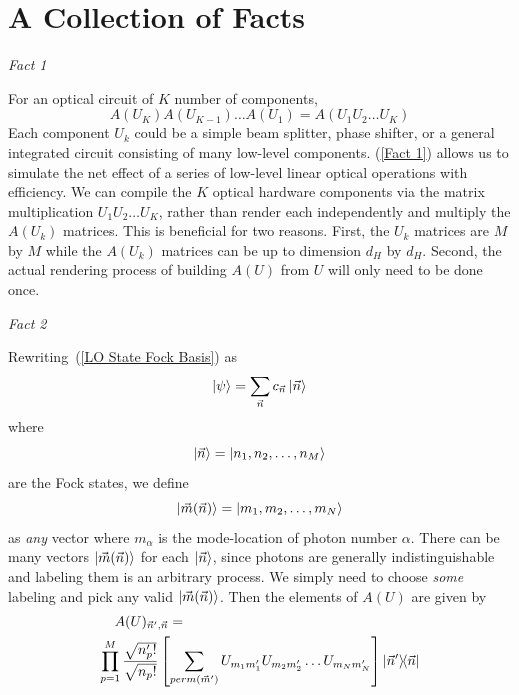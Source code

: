 \documentclass[aps,pra,twocolumn,showpacs,superscriptaddress,floatfix,10pt]{revtex4}
\begin{document}
\section{A Collection of Facts}
\label{Section of Facts}
\begin{center}\textit{Fact 1} \end{center}
For an optical circuit of $K$ number of components,
\begin{equation}
	\label{Fact 1}
\boxed{A(U_K) A(U_{K-1}) \dots A(U_1) = A(U_1 U_2 \dots U_K)}
\end{equation}
Each component $U_k$ could be a simple beam splitter, phase shifter, or a general integrated circuit consisting of many low-level components.
(\ref{Fact 1}) allows us to simulate the net effect of a series of low-level linear optical operations with efficiency. We can compile the $K$ optical hardware components via the matrix multiplication $U_1 U_2 \dots U_K$, rather than render each independently and multiply the $A(U_k)$ matrices. This is beneficial for two reasons. First, the $U_k$ matrices are $M$ by $M$ while the $A(U_k)$ matrices can be up to dimension $d_H$ by $d_H$. Second, the actual rendering process of building $A(U)$ from $U$ will only need to be done once.
\begin{center}\textit{Fact 2} \end{center}
Rewriting~(\ref{LO State Fock Basis}) as
\begin{equation}
\label{LO State Fock Vec Basis}
\ket{\psi} = \sum_{\vec{n}} c_{\vec{n}} \ket{\vec{n}}
\end{equation}
where
\begin{equation}
\ket{\vec{n}} = \ket{n_1,n_2,\dots,n_M}
\end{equation}
are the Fock states, we define
\begin{equation}
\label{m definition}
\ket{\vec{m}(\vec{n})} = \ket{m_1,m_2,\dots,m_N}
\end{equation}
as \textit{any} vector where $m_\alpha$ is the mode-location of photon number $\alpha$. There can be many vectors $\ket{\vec{m}(\vec{n})}$ for each $\ket{\vec{n}}$, since photons are generally indistinguishable and labeling them is an arbitrary process. We simply need to choose \textit{some} labeling and pick any valid $\ket{\vec{m}(\vec{n})}$. Then the elements of $A(U)$ are given by
\begin{eqnarray}
\label{Fact 2}
A(U)_{\vec{n}^\prime,\vec{n}} = \quad \quad \quad \quad \quad \quad \quad \quad \quad \quad \quad \quad \quad \quad \quad \quad \quad \\ \small \nonumber \prod_{p=1}^{M} \frac{\sqrt{n_p^\prime !}}{\sqrt{n_p !}} \left[\sum_{perm(\vec{m}^\prime)} U_{m_1 m_1^\prime} U_{m_2 m_2^\prime} \dots U_{m_N m_N^\prime} \right] \outerproduct{\vec{n}^\prime}{\vec{n}} 
\end{eqnarray}
\end{document}
